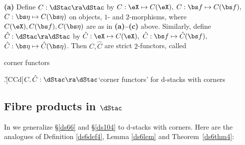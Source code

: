 \documentclass{article}
\begin{document}
\begin{thm}{\bf(a)}
 Define\/ $C:\dStac\ra\dStac$ by\/ $C:\eX\mapsto
C(\eX),$ $C:\bs f\mapsto C(\bs f),$ $C:\bs\eta\mapsto C(\bs\eta)$ on
objects, $1$- and\/ $2$-morphisms, where $C(\eX),C(\bs
f),C(\bs\eta)$ are as in {\bf(a){\rm --}(c)} above. Similarly,
define\/ $\hat C:\dStac\ra\dStac$ by $\hat C:\eX\mapsto C(\eX),$
$\hat C:\bs f\mapsto\hat C(\bs f),$ $\hat C:\bs\eta\mapsto\hat
C(\bs\eta)$. Then $C,\hat C$ are strict\/ $2$-functors, called
\begin{bfseries}corner functors\end{bfseries}.\G[CCd]{$C,\hat
C:\dStac\ra\dStac$}{`corner functors' for d-stacks with
corners}
\label{ds13thm4}
\end{thm}

\subsection{Fibre products in $\dStac$}
\label{ds136}

In \cite[\S 11.6]{Joyc6} we generalize \S\ref{ds66} and
\S\ref{ds104} to d-stacks with corners. Here are the analogues of
Definition \ref{ds6def4}, Lemma \ref{ds6lem} and
Theorem~\ref{ds6thm4}:
\end{document}
